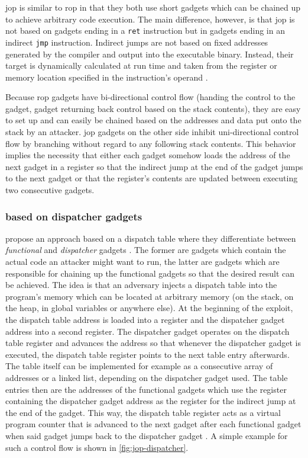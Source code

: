 \gls{jop} is similar to \gls{rop} in that they both use short gadgets which can be chained up to achieve arbitrary code execution.
The main difference, however, is that \gls{jop} is not based on gadgets ending in a \texttt{ret} instruction but in gadgets ending in an indirect \texttt{jmp} instruction.
Indirect jumps are not based on fixed addresses generated by the compiler and output into the executable binary.
Instead, their target is dynamically calculated at run time and taken from the register or memory location specified in the instruction's operand \cite[3-517\psqq]{IntelCorporation2020}.

Because \gls{rop} gadgets have bi-directional control flow (handing the control to the gadget, gadget returning back control based on the stack contents), they are easy to set up and can easily be chained based on the addresses and data put onto the stack by an attacker.
\gls{jop} gadgets on the other side inhibit uni-directional control flow by branching without regard to any following stack contents.
This behavior implies the necessity that either each gadget somehow loads the address of the next gadget in a register so that the indirect jump at the end of the gadget jumps to the next gadget or that the register's contents are updated between executing two consecutive gadgets.


\subsubsection{ based on dispatcher gadgets}
\label{subsubsec:cr-jop-dispatcher}

\citeauthor{Bletsch2011} propose an approach based on a dispatch table where they differentiate between \emph{functional} and \emph{dispatcher} gadgets \cite{Bletsch2011}.
The former are gadgets which contain the actual code an attacker might want to run, the latter are gadgets which are responsible for chaining up the functional gadgets so that the desired result can be achieved.
The idea is that an adversary injects a dispatch table into the program's memory which can be located at arbitrary memory (on the stack, on the heap, in global variables or anywhere else).
At the beginning of the exploit, the dispatch table address is loaded into a register and the dispatcher gadget address into a second register.
The dispatcher gadget operates on the dispatch table register and advances the address so that whenever the dispatcher gadget is executed, the dispatch table register points to the next table entry afterwards.
The table itself can be implemented for example as a consecutive array of addresses or a linked list, depending on the dispatcher gadget used.
The table entries then are the addresses of the functional gadgets which use the register containing the dispatcher gadget address as the register for the indirect jump at the end of the gadget.
This way, the dispatch table register acts as a virtual program counter that is advanced to the next gadget after each functional gadget when said gadget jumps back to the dispatcher gadget \cite{Bletsch2011}.
A simple example for such a control flow is shown in \cref{fig:jop-dispatcher}.

